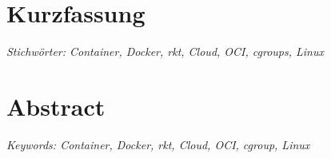 \chapter*{Kurzfassung}
\label{chap:kurzfassung}
\vfill
\textit{Stichwörter: Container, Docker, rkt, Cloud, OCI, cgroups, Linux}
\begingroup
\let\cleardoublepage\relax
\chapter*{Abstract}
\label{chap:Abstract}
\textit{Keywords: Container, Docker, rkt, Cloud, OCI, cgroup, Linux}
\endgroup